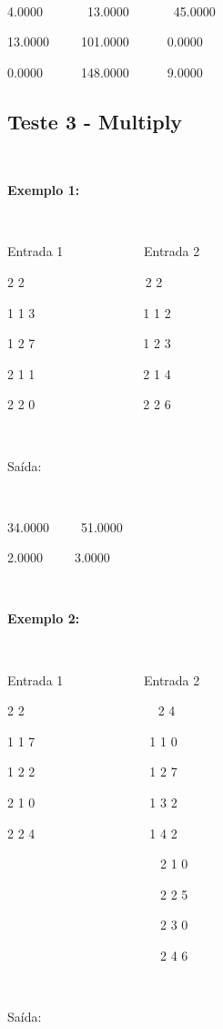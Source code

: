 \documentclass{article}
\begin{document}
~~~~~~~~~~~~~~~~~~~~~~~~~~~~~~~

4.0000~~~~~~~13.0000~~~~~~~45.0000

13.0000~~~~~101.0000~~~~~~0.0000

0.0000~~~~~~148.0000~~~~~~9.0000


\subsection{Teste 3 - Multiply}

~~~~~~~~~~~~~~~~~~~~~~~~~~~~~~

\textbf{Exemplo 1:}

~~~~~~~~~~~~~~~~~~~~~~~~~~~~~~

Entrada 1 ~~~~~~~~~~~~Entrada 2 

2 2~~~~~~~~~~~~~~~~~~~2 2

1 1 3~~~~~~~~~~~~~~~~~1 1 2               

1 2 7~~~~~~~~~~~~~~~~~1 2 3

2 1 1~~~~~~~~~~~~~~~~~2 1 4

2 2 0~~~~~~~~~~~~~~~~~2 2 6

~~~~~~~~~~~~~~~~~~~~~~~~~~~~~~~

Saída:

~~~~~~~~~~~~~~~~~~~~~~~~~~~~~~~

34.0000~~~~~51.0000

2.0000~~~~~3.0000

~~~~~~~~~~~~~~~~~~~~~~~~~~~~~~~

\textbf{Exemplo 2:}

~~~~~~~~~~~~~~~~~~~~~~~~~~~~~~~

Entrada 1 ~~~~~~~~~~~~Entrada 2 

2 2~~~~~~~~~~~~~~~~~~~~~2 4

1 1 7~~~~~~~~~~~~~~~~~~1 1 0               

1 2 2~~~~~~~~~~~~~~~~~~1 2 7

2 1 0~~~~~~~~~~~~~~~~~~1 3 2

2 2 4~~~~~~~~~~~~~~~~~~1 4 2

~~~~~~~~~~~~~~~~~~~~~~~~2 1 0

~~~~~~~~~~~~~~~~~~~~~~~~2 2 5

~~~~~~~~~~~~~~~~~~~~~~~~2 3 0

~~~~~~~~~~~~~~~~~~~~~~~~2 4 6

~~~~~~~~~~~~~~~~~~~~~~~~~~~~~~~

Saída:

~~~~~~~~~~~~~~~~~~~~~~~~~~~~~~~
\end{document}
